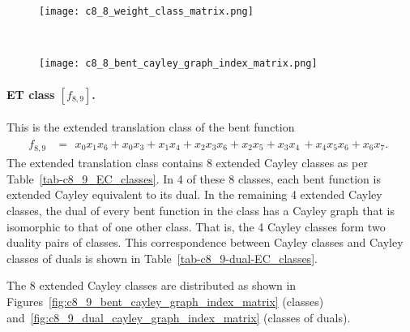 \documentclass[12pt,a4paper]{article}
\begin{document}
\begin{figure}[!bhpt] %
\centering
\begin{minipage}{.48\textwidth}
  \centering
  \texttt{[image: c8\_8\_weight\_class\_matrix.png]}
  \label{fig:c8_8_weight_class_matrix}
\end{minipage}%
~~~~
\begin{minipage}{.48\textwidth}
  \centering
  \texttt{[image: c8\_8\_bent\_cayley\_graph\_index\_matrix.png]}
  \label{fig:c8_8_bent_cayley_graph_index_matrix}
\end{minipage}
\end{figure}

\newpage
\paragraph*{ET class $[f_{8,9}]$.}
%
%
This is the extended translation class of the bent function
\small{}
\begin{align*}
f_{ 8 , 9 } &=
\begin{array}{l}
x_{0} x_{1} x_{6} + x_{0} x_{3} + x_{1} x_{4} + x_{2} x_{3} x_{6} + x_{2} x_{5} + x_{3} x_{4}\, +
x_{4} x_{5} x_{6} + x_{6} x_{7}.
\end{array}
\end{align*}
\normalsize{}
The extended translation class contains 8 extended Cayley classes as per Table~\ref{tab-c8_9_EC_classes}.
In 4 of these 8 classes, each bent function is extended Cayley equivalent to its dual.
In the remaining 4 extended Cayley classes, the dual of every bent function in the class has a Cayley graph
that is isomorphic to that of one other class. That is, the 4 Cayley classes form two duality pairs of classes.
This correspondence between Cayley classes and Cayley classes of duals is shown in Table~\ref{tab-c8_9-dual-EC_classes}.

The 8 extended Cayley classes are distributed
as shown in Figures~\ref{fig:c8_9_bent_cayley_graph_index_matrix} (classes) and~\ref{fig:c8_9_dual_cayley_graph_index_matrix}
(classes of duals).
\end{document}
